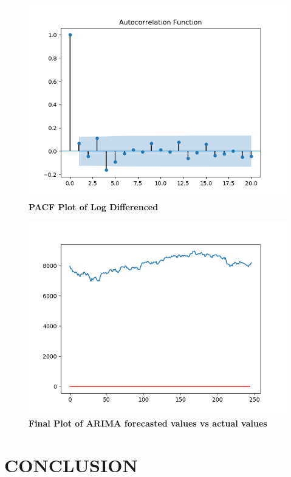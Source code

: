 \documentclass[BTech]{srmuthesis}
\begin{document}
\begin{figure}[H]
	\centering
	\includegraphics[width=\linewidth]{ARIMA_ACFLogDiff1.png}
	\caption{\bf PACF Plot of Log Differenced}
	\label{fig:ARIMA_PACFLogDiff}
\end{figure}

\begin{figure}[H]
	\centering
	\includegraphics[width=\linewidth]{ARIMA_Final.png}
	\caption{\bf Final Plot of ARIMA forecasted values vs actual values}
	\label{fig:ARIMA_Final}
\end{figure}


\chapter{CONCLUSION}
\end{document}
